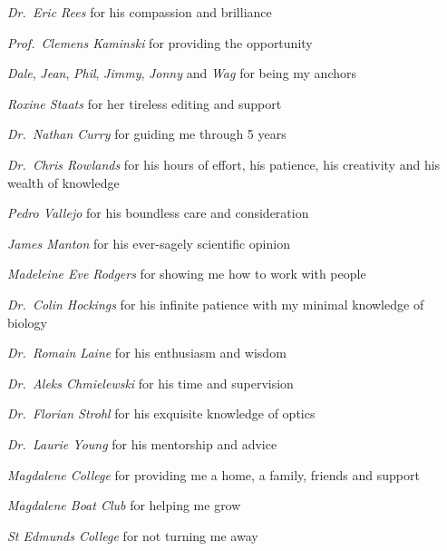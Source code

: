 
\begin{acknowledgements}
  \begin{description}%
    \item \emph{Dr.~Eric Rees} for his compassion and brilliance
    \item \emph{Prof.~Clemens Kaminski} for providing the opportunity
    \item \emph{Dale}, \emph{Jean}, \emph{Phil}, \emph{Jimmy}, \emph{Jonny} and \emph{Wag} for being my anchors
    \item \emph{Roxine Staats} for her tireless editing and support
    \item \emph{Dr.~Nathan Curry} for guiding me through 5 years
    \item \emph{Dr.~Chris Rowlands} for his hours of effort, his patience, his creativity and his wealth of knowledge
    \item \emph{Pedro Vallejo} for his boundless care and consideration
    \item \emph{James Manton} for his ever-sagely scientific opinion
    \item \emph{Madeleine Eve Rodgers} for showing me how to work with people
    \item \emph{Dr.~Colin Hockings} for his infinite patience with my minimal knowledge of biology
    \item \emph{Dr.~Romain Laine} for his enthusiasm and wisdom
    \item \emph{Dr.~Aleks Chmielewski} for his time and supervision
    \item \emph{Dr.~Florian Strohl} for his exquisite knowledge of optics
    \item \emph{Dr.~Laurie Young} for his mentorship and advice
    \item \emph{Magdalene College} for providing me a home, a family, friends and support
    \item \emph{Magdalene Boat Club} for helping me grow
    \item \emph{St Edmunds College} for not turning me away
  \end{description}
\end{acknowledgements}
